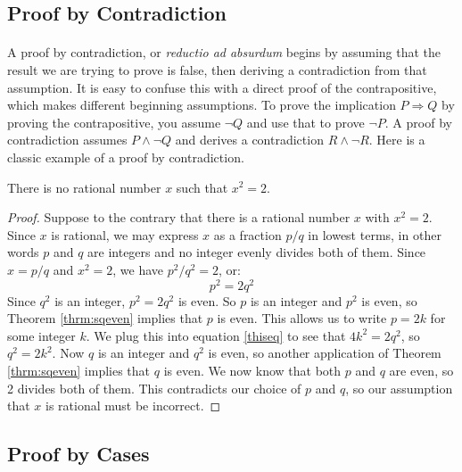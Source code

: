 \subsection{Proof by Contradiction}

\paragraph{} A proof by contradiction, or \emph{reductio ad absurdum}   begins by assuming that the result we are trying to prove is false, then deriving a contradiction from that assumption.  It is easy to confuse this with a direct proof of the contrapositive, which makes different beginning assumptions. To prove the implication $P\Rightarrow Q$ by proving the contrapositive, you assume $\neg Q$ and use that to prove $\neg P$. A proof by contradiction assumes $P\land \neg Q$ and derives a contradiction $R\land \neg R$. Here is a classic example of a proof by contradiction.

\begin{thrm}\label{thrm:sqrttwo}
There is no rational number $x$ such that $x^2=2$.
\end{thrm}

\begin{proof}
Suppose to the contrary that there is a rational number $x$ with
$x^2=2$.  Since $x$ is rational, we may express $x$ as a fraction $p/q$
in lowest terms, in other words $p$ and $q$ are integers and no integer
evenly divides both of them.  Since $x=p/q$ and $x^2=2$, we have
$p^2/q^2=2$, or:
\begin{equation}\label{thiseq}
p^2=2q^2
\end{equation}
Since $q^2$ is an integer, $p^2=2q^2$ is even.  So $p$ is an integer and
$p^2$ is even, so Theorem \ref{thrm:sqeven} implies that $p$ is even.
This allows us to write $p=2k$ for some integer $k$.  We plug this into
equation \ref{thiseq} to see that $4k^2=2q^2$, so $q^2=2k^2$. Now $q$ is
an integer and $q^2$ is even, so another application of Theorem
\ref{thrm:sqeven} implies that $q$ is even.  We now know that both $p$
and $q$ are even, so 2 divides both of them.  This contradicts our
choice of $p$ and $q$, so our assumption that $x$ is rational must be
incorrect.
\end{proof}

\subsection{Proof by Cases}

